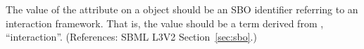 The value of the attribute  on a \Reaction object should be
an SBO identifier referring to an interaction framework.  That is, the
value should be a term derived from \sbointeractionID, ``interaction''.
(References: SBML L3V2 Section~\ref{sec:sbo}.)
